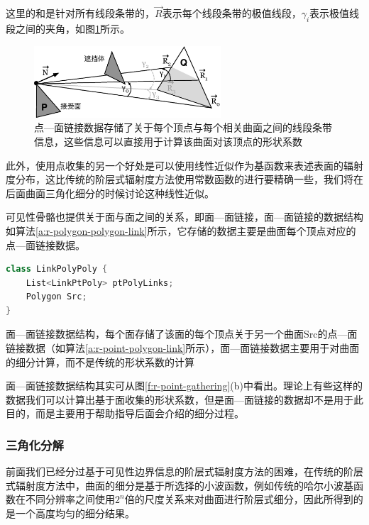 \noindent 这里的和是针对所有线段条带的，$\vec{R}$表示每个线段条带的极值线段，$\gamma_i$表示极值线段之间的夹角，如图\ref{f:r-point-polygon-link}所示。

\begin{figure}
	\sidecaption
	\includegraphics[width=0.62\textwidth]{figures/r/point-polygon-link}
	\caption{点—面链接数据存储了关于每个顶点与每个相关曲面之间的线段条带信息，这些信息可以直接用于计算该曲面对该顶点的形状系数}
	\label{f:r-point-polygon-link}
\end{figure}

此外，使用点收集的另一个好处是可以使用线性近似作为基函数来表述表面的辐射度分布，这比传统的阶层式辐射度方法使用常数函数的进行要精确一些，我们将在后面曲面三角化细分的时候讨论这种线性近似。

可见性骨骼也提供关于面与面之间的关系，即面—面链接，面—面链接的数据结构如算法\ref{a:r-polygon-polygon-link}所示，它存储的数据主要是曲面每个顶点对应的点—面链接数据。

\begin{algorithm}
\begin{lstlisting}[language=C++, mathescape]
class LinkPolyPoly {
	List<LinkPtPoly> ptPolyLinks;
	Polygon Src;
}
\end{lstlisting}
\caption{面—面链接数据结构，每个面存储了该面的每个顶点关于另一个曲面Src的点—面链接数据（如算法\ref{a:r-point-polygon-link}所示），面—面链接数据主要用于对曲面的细分计算，而不是传统的形状系数的计算}
\label{a:r-polygon-polygon-link}
\end{algorithm}

面—面链接数据结构其实可从图\ref{f:r-point-gathering}(b)中看出。理论上有些这样的数据我们可以计算出基于面收集的形状系数，但是面—面链接的数据却不是用于此目的，而是主要用于帮助指导后面会介绍的细分过程。




\subsubsection{三角化分解}\label{sec:rad-triangulation}
前面我们已经分过基于可见性边界信息的阶层式辐射度方法的困难，在传统的阶层式辐射度方法中，曲面的细分是基于所选择的小波函数，例如传统的哈尔小波基函数在不同分辨率之间使用$2^{n}$倍的尺度关系来对曲面进行阶层式细分，因此所得到的是一个高度均匀的细分结果。

